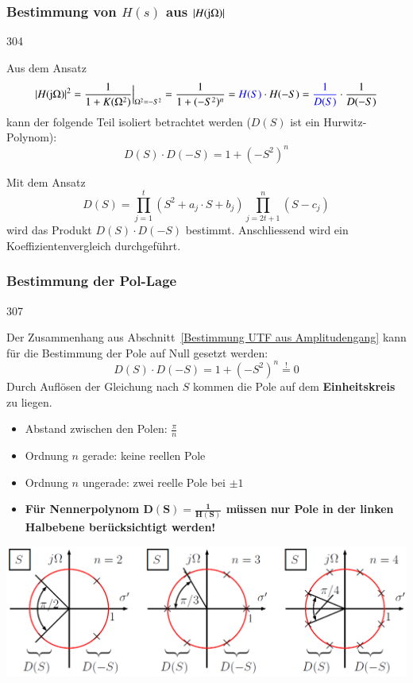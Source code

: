 \subsubsection[Bestimmung von H(s) aus |H(jimg Omega)|]{Bestimmung von $H(s)$ aus $|H(\mathrm{j} \Omega)|$}{304}
\label{Bestimmung UTF aus Amplitudengang}

Aus dem Ansatz 
$$ | H(\mathrm{j} \Omega) |^2 = \frac{1}{1 + K(\Omega^2)} \Big|_{\Omega^2 = -S^2} = \frac{1}{1 + (-S^2)^n} = {\color{blue}H(S)} \cdot H(-S)
    = {\color{blue}\frac{1}{D(S)}} \cdot \frac{1}{D(-S)} $$
kann der folgende Teil isoliert betrachtet werden ($D(S)$ ist ein Hurwitz-Polynom):
$$ \boxed{ D(S) \cdot D(-S) = 1 + (-S^2)^n } $$

Mit dem Ansatz 
$$ \boxed{ D(S) = \prod\limits_{j=1}^{t} (S^2 + a_j \cdot S + b_j) \prod\limits_{j=2t+1}^{n} (S - c_j) } $$
wird das Produkt $D(S) \cdot D(-S)$ bestimmt. Anschliessend wird ein Koeffizientenvergleich durchgeführt.

\subsubsection{Bestimmung der Pol-Lage}{307}

Der Zusammenhang aus Abschnitt~\ref{Bestimmung UTF aus Amplitudengang} kann für die Bestimmung der Pole auf Null gesetzt werden:
$$ \boxed{ D(S) \cdot D(-S) = 1 + (-S^2)^n \overset{!}{=} 0 } $$
Durch Auflösen der Gleichung nach $S$ kommen die Pole auf dem \textbf{Einheitskreis} zu liegen.

\begin{itemize}
    \item Abstand zwischen den Polen: $\frac{\pi}{n}$
    \item Ordnung $n$ gerade: keine reellen Pole
    \item Ordnung $n$ ungerade: zwei reelle Pole bei $\pm 1$
    \item \textbf{Für Nennerpolynom $\bm{D(S) = \frac{1}{H(S)}}$ müssen nur Pole in der linken Halbebene berücksichtigt werden!}
\end{itemize}

\begin{center}
    \includegraphics[width=0.8\columnwidth]{images/filter_pollage_butterworth.png}
\end{center}


